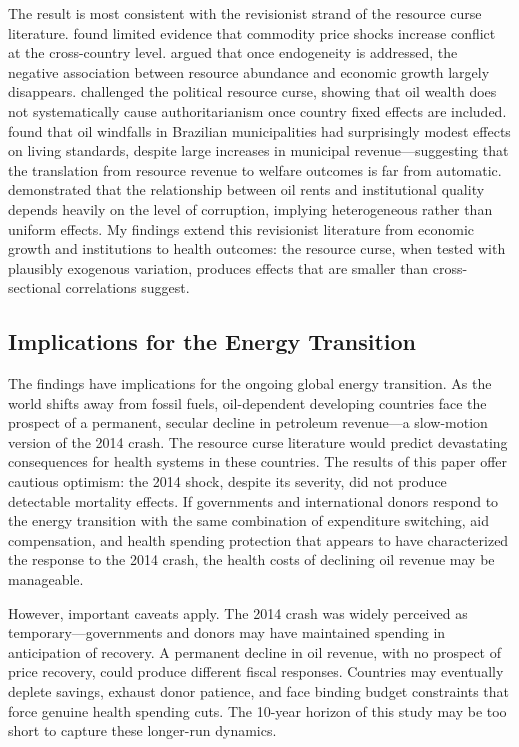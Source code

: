 \documentclass[12pt]{article}
\begin{document}
The result is most consistent with the revisionist strand of the resource curse literature. \citet{bazzi2014economic} found limited evidence that commodity price shocks increase conflict at the cross-country level. \citet{brunnschweiler2008curse} argued that once endogeneity is addressed, the negative association between resource abundance and economic growth largely disappears. \citet{haber2011resource} challenged the political resource curse, showing that oil wealth does not systematically cause authoritarianism once country fixed effects are included. \citet{caselli2013oil} found that oil windfalls in Brazilian municipalities had surprisingly modest effects on living standards, despite large increases in municipal revenue---suggesting that the translation from resource revenue to welfare outcomes is far from automatic. \citet{arezki2011oil} demonstrated that the relationship between oil rents and institutional quality depends heavily on the level of corruption, implying heterogeneous rather than uniform effects. My findings extend this revisionist literature from economic growth and institutions to health outcomes: the resource curse, when tested with plausibly exogenous variation, produces effects that are smaller than cross-sectional correlations suggest.

\subsection{Implications for the Energy Transition}

The findings have implications for the ongoing global energy transition. As the world shifts away from fossil fuels, oil-dependent developing countries face the prospect of a permanent, secular decline in petroleum revenue---a slow-motion version of the 2014 crash. The resource curse literature would predict devastating consequences for health systems in these countries. The results of this paper offer cautious optimism: the 2014 shock, despite its severity, did not produce detectable mortality effects. If governments and international donors respond to the energy transition with the same combination of expenditure switching, aid compensation, and health spending protection that appears to have characterized the response to the 2014 crash, the health costs of declining oil revenue may be manageable.

However, important caveats apply. The 2014 crash was widely perceived as temporary---governments and donors may have maintained spending in anticipation of recovery. A permanent decline in oil revenue, with no prospect of price recovery, could produce different fiscal responses. Countries may eventually deplete savings, exhaust donor patience, and face binding budget constraints that force genuine health spending cuts. The 10-year horizon of this study may be too short to capture these longer-run dynamics.
\end{document}
